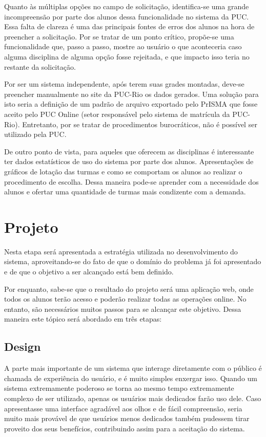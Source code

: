 \documentclass[graduacao,brazil]{ThesisPUC}
\begin{document}
Quanto às múltiplas opções no campo de solicitação, identifica-se uma grande incompreensão por parte dos alunos dessa funcionalidade no sistema da PUC. Essa falta de clareza é uma das principais fontes de erros dos alunos na hora de preencher a solicitação. Por se tratar de um ponto crítico, propõe-se uma funcionalidade que, passo a passo, mostre ao usuário o que aconteceria caso alguma disciplina de alguma opção fosse rejeitada, e que impacto isso teria no restante da solicitação.

Por ser um sistema independente, após terem suas grades montadas, deve-se preencher manualmente no site da PUC-Rio os dados gerados. Uma solução para isto seria a definição de um padrão de arquivo exportado pelo PrISMA que fosse aceito pelo PUC Online (setor responsável pelo sistema de matrícula da PUC-Rio). Entretanto, por se tratar de procedimentos burocráticos, não é possível ser utilizado pela PUC.

De outro ponto de vista, para aqueles que oferecem as disciplinas é interessante ter dados estatísticos de uso do sistema por parte dos alunos. Apresentações de gráficos de lotação das turmas e como se comportam os alunos ao realizar o procedimento de escolha. Dessa maneira pode-se aprender com a necessidade dos alunos e ofertar uma quantidade de turmas mais condizente com a demanda.


\chapter{Projeto}

Nesta etapa será apresentada a estratégia utilizada no desenvolvimento do sistema, aproveitando-se do fato de que o domínio do problema já foi apresentado e de que o objetivo a ser alcançado está bem definido.

Por enquanto, sabe-se que o resultado do projeto será uma aplicação web, onde todos os alunos terão acesso e poderão realizar todas as operações online. No entanto, são necessários muitos passos para se alcançar este objetivo. Dessa maneira este tópico será abordado em três etapas:

\section{Design}

A parte mais importante de um sistema que interage diretamente com o público é chamada de experiência do usuário, e é muito simples enxergar isso. Quando um sistema extremamente poderoso se torna ao mesmo tempo extremamente complexo de ser utilizado, apenas os usuários mais dedicados farão uso dele. Caso apresentasse uma interface agradável aos olhos e de fácil compreensão, seria muito mais provável de que usuários menos dedicados também pudessem tirar proveito dos seus benefícios, contribuindo assim para a aceitação do sistema.
\end{document}
